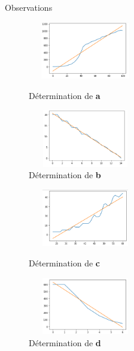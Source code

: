 \documentclass{beamer}
\begin{document}
\begin{frame}{Observations}
    \begin{figure}[h]
        \begin{minipage}[c]{.46\linewidth}
            \centering
            \includegraphics[width=5cm, height=2.5cm]{images/courbe1.png} 
            \caption{Détermination de \textbf{a}}
        \end{minipage}
        \hfill%
        \begin{minipage}[c]{.46\linewidth} \pause
            \centering
            \includegraphics[width=5cm, height=2.5cm]{images/courbe2_.png} 
            \caption{Détermination de \textbf{b}}
        \end{minipage}
    \end{figure}
    
    \begin{figure}[h]
        \begin{minipage}[c]{.46\linewidth} \pause
            \centering
            \includegraphics[width=5cm, height=2.5cm]{images/courbe3.png} 
            \caption{Détermination de \textbf{c}}
        \end{minipage}
        \hfill%
        \begin{minipage}[c]{.46\linewidth} \pause
            \centering
            \includegraphics[width=5cm, height=2.5cm]{images/courbe2.png} 
            \caption{Détermination de \textbf{d}}
        \end{minipage}
    \end{figure}
\end{frame}
\end{document}
